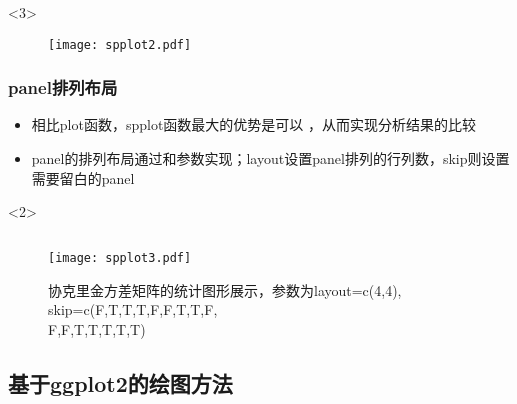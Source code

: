 \begin{frame}[t,fragile]{\subsecname}{\subsubsecname}
\begin{overlayarea}{\textwidth}{\textheight}
\begin{onlyenv}<3>
\begin{figure}[ht] \vspace{-20pt}
  \centering 
  \texttt{[image: spplot2.pdf]}
\end{figure}
\end{onlyenv}
\end{overlayarea}
\end{frame}

\subsubsection{panel排列布局}
\begin{frame}[t,fragile]{\subsecname}{\subsubsecname}
\begin{itemize} 
\item<1-> 相比plot函数，spplot函数最大的优势是可以
，从而实现分析结果的比较
\item<1-> panel的排列布局通过和参数实现；layout设置panel排列的行列数，skip则设置需要留白的panel
\end{itemize}

\begin{overlayarea}{\textwidth}{\textheight}
\begin{onlyenv}<2>
  \begin{figure} \vspace{-10pt}
    \begin{columns}
      \begin{column}{.6\textwidth}
        \texttt{[image: spplot3.pdf]}
      \end{column}
       \hspace{-40pt}    
      \begin{column}{.4\textwidth}
 \caption{协克里金方差矩阵的统计图形展示，参数为layout=c(4,4),\\skip=c(F,T,T,T,F,F,T,T,F,\\F,F,T,T,T,T,T)}
      \end{column}
    \end{columns}
  \end{figure}
\end{onlyenv}
\end{overlayarea}
\end{frame}

\subsection{基于ggplot2的绘图方法}
